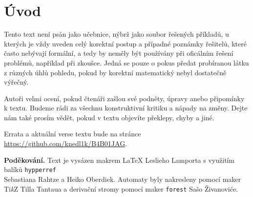 \section*{Úvod}



\hspace{0.8cm} Tento text není psán jako učebnice, nýbrž jako soubor řešených příkladů, u kterých je vždy uveden celý korektní postup
a případné poznámky řešitelů, které často nebývají formální, a tedy by neměly být používány při oficálním řešení problémů, 
například při zkoušce. Jedná se pouze o pokus předat probíranou látku z různých úhlů pohledu, pokud by korektní matematický
nebyl dostatečně výřečný.

\hspace{0.8cm} Autoři velmi ocení, pokud čtenáři zašlou své podněty, úpravy anebo připomínky k textu. Budeme rádi za všechnu konstruktivní
kritiku a nápady na změny. Dejte nám také prosím vědět, pokud v textu objevíte překlepy, chyby a jiné.

Errata a aktuální verse textu bude na stránce \url{https://github.com/knedl1k/B4B01JAG}.

\textbf{Poděkování.} Text je vysázen makrem \LaTeX{} Leslieho Lamporta s využitím balíků \texttt{hypperref} \\ 
Sebastiana Rahtze a Heiko Oberdiek. Automaty byly nakresleny pomocí maker Ti\textit{k}Z Tilla Tantaua a derivační
stromy pomocí maker \texttt{forest} Sašo Živanoviće.